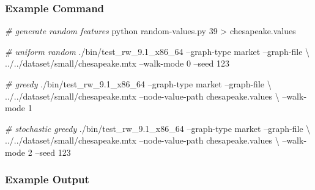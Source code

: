 \documentclass[10pt,oneside]{memoir}
\newenvironment{Shaded}{}{}
\newcommand{\CommentTok}[1]{\textcolor[rgb]{0.38,0.63,0.69}{\textit{#1}}}
\newcommand{\ExtensionTok}[1]{#1}
\newcommand{\NormalTok}[1]{#1}
\newcommand{\OperatorTok}[1]{\textcolor[rgb]{0.40,0.40,0.40}{#1}}
\begin{document}
\hypertarget{example-command-2}{%
\subsubsection{Example Command}\label{example-command-2}}

\begin{Shaded}
\begin{Highlighting}[]
\CommentTok{# generate random features}
\ExtensionTok{python}\NormalTok{ random-values.py 39 }\OperatorTok{>}\NormalTok{ chesapeake.values}

\CommentTok{# uniform random}
\ExtensionTok{./bin/test_rw_9.1_x86_64}\NormalTok{ --graph-type market --graph-file \textbackslash{}}
\NormalTok{  ../../dataset/small/chesapeake.mtx --walk-mode 0 --seed 123}

\CommentTok{# greedy}
\ExtensionTok{./bin/test_rw_9.1_x86_64}\NormalTok{ --graph-type market --graph-file \textbackslash{}}
\NormalTok{  ../../dataset/small/chesapeake.mtx --node-value-path chesapeake.values \textbackslash{}}
\NormalTok{  --walk-mode 1}

\CommentTok{# stochastic greedy}
\ExtensionTok{./bin/test_rw_9.1_x86_64}\NormalTok{ --graph-type market --graph-file \textbackslash{}}
\NormalTok{  ../../dataset/small/chesapeake.mtx --node-value-path chesapeake.values \textbackslash{}}
\NormalTok{  --walk-mode 2 --seed 123}
\end{Highlighting}
\end{Shaded}

\hypertarget{example-output-1}{%
\subsubsection{Example Output}\label{example-output-1}}
\end{document}
